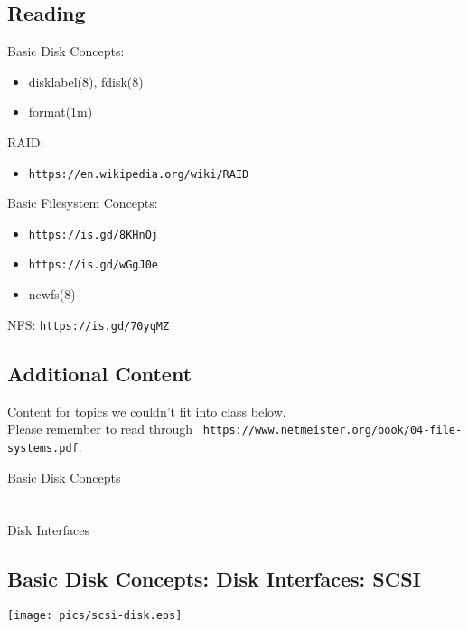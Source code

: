 \documentclass[xga]{xdvislides}
\begin{document}
\subsection{Reading}
Basic Disk Concepts:
\begin{itemize}
	\item disklabel(8), fdisk(8)
	\item format(1m)
\end{itemize}
RAID:
\begin{itemize}
	\item \verb+https://en.wikipedia.org/wiki/RAID+
\end{itemize}
Basic Filesystem Concepts:
\begin{itemize}
	\item \verb+https://is.gd/8KHnQj+
	\item \verb+https://is.gd/wGgJ0e+
	\item newfs(8)
\end{itemize}
NFS: \verb+https://is.gd/70yqMZ+

\subsection{Additional Content}

Content for topics we couldn't fit into class below.
\\

Please remember to read through {\tt
https://www.netmeister.org/book/04-file-systems.pdf}.

\newpage
\vspace*{\fill}
\begin{center}
	\Hugesize
		Basic Disk Concepts \\ [1em]
	\hspace*{5mm}
	\blueline\\
	\hspace*{5mm}\\
		Disk Interfaces
\end{center}
\vspace*{\fill}

\subsection{Basic Disk Concepts: Disk Interfaces: SCSI}
\vfill
	\begin{center}
		\texttt{[image: pics/scsi-disk.eps]} \\
	\end{center}
\vfill
\end{document}
